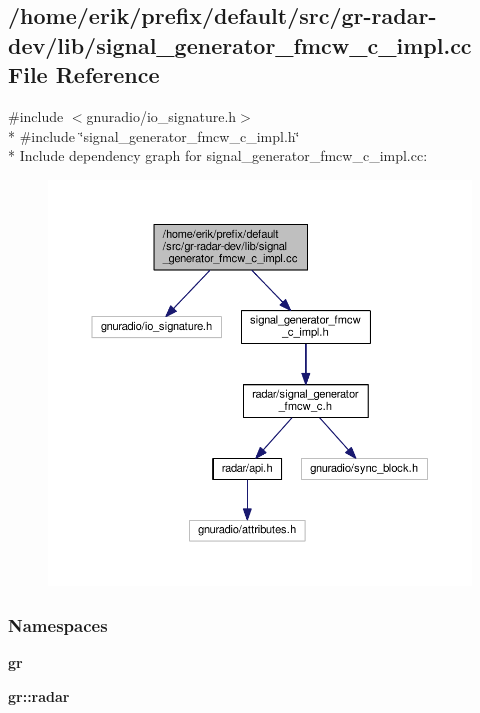 \subsection{/home/erik/prefix/default/src/gr-\/radar-\/dev/lib/signal\+\_\+generator\+\_\+fmcw\+\_\+c\+\_\+impl.cc File Reference}
\label{signal__generator__fmcw__c__impl_8cc}
{\ttfamily \#include $<$gnuradio/io\+\_\+signature.\+h$>$}\\*
{\ttfamily \#include \char`\"{}signal\+\_\+generator\+\_\+fmcw\+\_\+c\+\_\+impl.\+h\char`\"{}}\\*
Include dependency graph for signal\+\_\+generator\+\_\+fmcw\+\_\+c\+\_\+impl.\+cc\+:
\nopagebreak
\begin{figure}[H]
\begin{center}
\leavevmode
\includegraphics[width=350pt]{df/dd7/signal__generator__fmcw__c__impl_8cc__incl}
\end{center}
\end{figure}
\subsubsection*{Namespaces}
\begin{DoxyCompactItemize}
\item 
 {\bf gr}
\item 
 {\bf gr\+::radar}
\end{DoxyCompactItemize}
